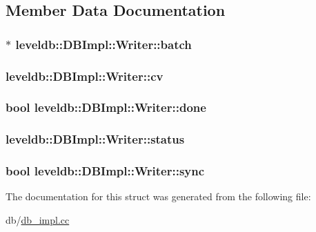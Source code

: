 \subsection{Member Data Documentation}
\hypertarget{structleveldb_1_1_d_b_impl_1_1_writer_ada051134318411635892f0a7d17cb7c0}{
\subsubsection[{batch}]{$\ast$ leveldb\-::\-D\-B\-Impl\-::\-Writer\-::batch}}\label{structleveldb_1_1_d_b_impl_1_1_writer_ada051134318411635892f0a7d17cb7c0}
\hypertarget{structleveldb_1_1_d_b_impl_1_1_writer_aacb835eedc44855a7c223fca024c5ac4}{
\subsubsection[{cv}]{ leveldb\-::\-D\-B\-Impl\-::\-Writer\-::cv}}\label{structleveldb_1_1_d_b_impl_1_1_writer_aacb835eedc44855a7c223fca024c5ac4}
\hypertarget{structleveldb_1_1_d_b_impl_1_1_writer_afc6025afd873f82252cb563687bd3106}{
\subsubsection[{done}]{\setlength{\rightskip}{0pt plus 5cm}bool leveldb\-::\-D\-B\-Impl\-::\-Writer\-::done}}\label{structleveldb_1_1_d_b_impl_1_1_writer_afc6025afd873f82252cb563687bd3106}
\hypertarget{structleveldb_1_1_d_b_impl_1_1_writer_af3b0436a99d2679c0e0ac9f6e1fefa37}{
\subsubsection[{status}]{ leveldb\-::\-D\-B\-Impl\-::\-Writer\-::status}}\label{structleveldb_1_1_d_b_impl_1_1_writer_af3b0436a99d2679c0e0ac9f6e1fefa37}
\hypertarget{structleveldb_1_1_d_b_impl_1_1_writer_acb39717e1fa61127f262b474e18ec9f6}{
\subsubsection[{sync}]{\setlength{\rightskip}{0pt plus 5cm}bool leveldb\-::\-D\-B\-Impl\-::\-Writer\-::sync}}\label{structleveldb_1_1_d_b_impl_1_1_writer_acb39717e1fa61127f262b474e18ec9f6}


The documentation for this struct was generated from the following file\-:\begin{DoxyCompactItemize}
\item 
db/\hyperlink{db__impl_8cc}{db\-\_\-impl.\-cc}\end{DoxyCompactItemize}
